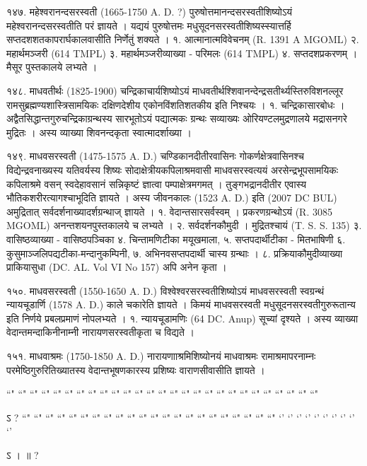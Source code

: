 १४७. महेश्वरानन्दसरस्वती (1665-1750 A. D. ?)
पुरुषोत्तमानन्दसरस्वतीशिष्योऽयं महेश्वरानन्दसरस्वतीति परं ज्ञायते । यद्ययं पुरुषोत्तमः मधुसूदनसरस्वतीशिष्यस्स्यात्तर्हि सप्तदशशतकापरार्घकालवासीति निर्णेतुं शक्यते ।
१. आत्मानात्मविवेचनम् (R. 1391 A MGOML)
२. महार्थमञ्जरी (614 TMPL)
३. महार्थमञ्जरीव्याख्या - परिमलः (614 TMPL)
४. सप्तदशप्रकरणम् । मैसूर पुस्तकालये लभ्यते ।

१४८. माधवतीर्थः (1825-1900)
चन्द्रिकाचार्यशिष्योऽयं माधवतीर्थश्शिवानन्देन्द्रसतीर्थ्यस्तिरुविशनल्लूर रामसुब्रह्मण्यशास्त्रिसामयिकः दक्षिणदेशीय एकोनविंशतिशतकीय इति निश्चयः ।
१. चन्द्रिकासारबोधः । अद्वैतसिद्धान्तगुरुचन्द्रिकाग्रन्थस्य सारभूतोऽयं पद्यात्मकः ग्रन्थः सव्याख्यः ओरियण्टलमुद्रणालये मद्रासनगरे मुद्रितः । अस्य व्याख्या शिवनन्दकृता स्वात्मादर्शाख्या ।

१४९. माधवसरस्वती (1475-1575 A. D.)
चण्डिकानदीतीरवासिनः गोकर्णक्षेत्रवासिनश्च विद्येन्द्रवनाख्यस्य यतिवर्यस्य शिष्यः सोदाक्षेत्रीयकपिलाश्रमवासी माधवसरस्वत्ययं अरसेन्द्रभूपसामयिकः कपिलाश्रमे वसन् स्वदेहावसानं सन्निकृष्टं ज्ञात्वा पम्पाक्षेत्रमगमत् । तुङ्गभद्रानदीतीर एवास्य भौतिकशरीरत्यागश्चाभूदिति ज्ञायते । अस्य जीवनकालः (1523 A. D.) इति (2007 DC BUL) अमुद्रितात् सर्वदर्शनाख्यादर्शग्रन्थाज् ज्ञायते ।
१. वेदान्तसारसर्वस्वम् । प्रकरणग्रन्थोऽयं (R. 3085 MGOML) अनन्तशयनपुस्तकालये च लभ्यते ।
२. सर्वदर्शनकौमुदी । मुद्रितश्चायं (T. S. S. 135)
३. वासिष्ठव्याख्या - वासिष्ठपञ्चिका
४. चिन्तामणिटीका मयूखमाला, 
५. सप्तपदार्थीटीका - मितभाषिणी
६. कुसुमाञ्जलिपद्यटीका-मन्दानुकम्पिनी,
७. अभिनवसप्तपदार्थी चास्य ग्रन्थाः ।
८. प्रक्रियाकौमुदीव्याख्या प्राकियासुधा (DC. AL. Vol VI No 157) अपि अनेन कृता ।

१५०. माधवसरस्वती (1550-1650 A. D.)
विश्वेश्वरसरस्वतीशिष्योऽयं माधवसरस्वती स्वग्रन्थं न्यायचूडार्णि (1578 A. D.) काले चकारेति ज्ञायते । किमयं माधवसरस्वती मधुसूदनसरस्वतीगुरुरूतान्य इति निर्णये प्रबलप्रमाणं नोपलभ्यते ।
१. न्यायचूडामणिः (64 DC. Anup) सूच्यां दृश्यते । अस्य व्याख्या वेदान्तमन्दाकिनीनाम्नी नारायणसरस्वतीकृता च विद्यते ।

१५१. माधवाश्रमः (1750-1850 A. D.)
नारायणााश्रमिशिष्योनयं माधवाश्रमः रामाश्रमापरनाम्नः परमेष्ठिगुरुरितिख्यातस्य वेदान्तभूषणकारस्य प्रशिष्यः वाराणसीवासीति ज्ञायते ।






 ``" ``" ``" ``" ``" ``" ``" ``" ``" ``" ``" ``" ``" ``" ``" ``" ``" ``" ``" ``" ``" ``" ``" ``" ``" ``" ``"

ऽ  ?
``" ``" ``" ``" ``" ``" ``" ``" ``" ``" ``" ``" ``" ``" ``" ``" ``" ``" ``" ``" ``" ``"
`' `' `' `' `' `' `' `' `' `' 

ऽ  ।   ॥ ?
